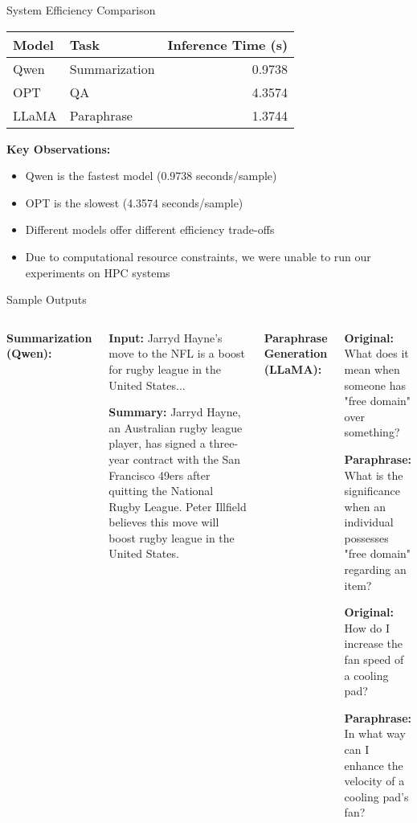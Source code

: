 \documentclass{beamer}
\begin{document}
\begin{frame}{System Efficiency Comparison}
\begin{table}
\centering
\begin{tabular}{@{}llr@{}}
\toprule
\textbf{Model} & \textbf{Task} & \textbf{Inference Time (s)} \\
\midrule
Qwen & Summarization & 0.9738 \\
OPT & QA & 4.3574 \\
LLaMA & Paraphrase & 1.3744 \\
\bottomrule
\end{tabular}
\end{table}

\textbf{Key Observations:}
\begin{itemize}
    \item Qwen is the fastest model (0.9738 seconds/sample)
    \item OPT is the slowest (4.3574 seconds/sample)
    \item Different models offer different efficiency trade-offs
    \item Due to computational resource constraints, we were unable to run our experiments on HPC systems
\end{itemize}
\end{frame}

\begin{frame}{Sample Outputs}
\begin{columns}[T]
\textbf{Summarization (Qwen):}
\begin{scriptsize} %
\textbf{Input:} Jarryd Hayne's move to the NFL is a boost for rugby league in the United States...

\textbf{Summary:} Jarryd Hayne, an Australian rugby league player, has signed a three-year contract with the San Francisco 49ers after quitting the National Rugby League. Peter Illfield believes this move will boost rugby league in the United States.
\end{scriptsize}

\textbf{Paraphrase Generation (LLaMA):}
\begin{scriptsize} %
\textbf{Original:} What does it mean when someone has "free domain" over something?

\textbf{Paraphrase:} What is the significance when an individual possesses "free domain" regarding an item?

\textbf{Original:} How do I increase the fan speed of a cooling pad?

\textbf{Paraphrase:} In what way can I enhance the velocity of a cooling pad's fan?
\end{scriptsize}
\end{columns}
\end{frame}
\end{document}

